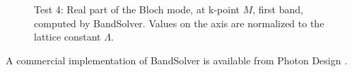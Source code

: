 \begin{figure}[htbp]
  \begin{center}
  \end{center}
  \caption{Test 4: Real part of the Bloch mode, at k-point $M$, first
  band, computed by BandSolver. Values on the axis are normalized to
  the lattice constant $\Lambda$.}
  \label{fig:test_4_field}
\end{figure}

\vspace{2cm}
A commercial implementation of BandSolver is available from Photon Design \cite{photond}.


